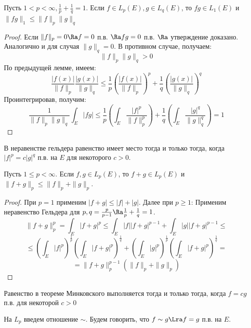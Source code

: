 \begin{theorem}[Гельдер]
    Пусть \(1 < p < \infty, \frac{1}{p} + \frac{1}{q} = 1\). Если \(f \in L_p(E), g \in L_q(E)\), то \(fg \in L_1(E)\) и \(\|fg\|_1 \le \|f\|_p\|g\|_q\)
\end{theorem}
\begin{proof}
    Если \(\|f\|_p = 0 \Ra f = 0\) п.в. \(\Ra fg = 0\) п.в. \(\Ra \) утверждение доказано. Аналогично и для случая \(\|g\|_q = 0\). В противном случае, получаем:
    \[\|f\|_p\|g\|_q > 0\]
    По предыдущей лемме, имеем:
    \[\frac{|f(x)|}{\|f\|_p}\frac{|g(x)|}{\|g\|_q} \le \frac{1}{p}\left( \frac{|f(x)|}{\|f\|_p} \right)^p + \frac{1}{q}\left( \frac{|g(x)|}{\|g\|_q} \right)^q\]
    Проинтегрировав, получим:
    \[\frac{1}{\|f\|_p\|g\|_q}\int_E |fg| \le \frac{1}{p}\left( \int_E \frac{|f|^p}{\|f\|_p^p} \right) + \frac{1}{q}\left( \int_E \frac{|g|^q}{\|g\|_q^q} \right) = 1\]
\end{proof}

\begin{note}
    В неравенстве гельдера равенство имеет место тогда и только тогда, когда \(|f|^p = c|g|^q\) п.в. на \(E\) для некоторого \(c > 0\).
\end{note}

\begin{theorem}[Минковский]
    Пусть \(1 \le p < \infty\). Если \(f, g \in L_p(E)\), то \(f + g \in L_p(E)\) и \(\|f + g\|_p \le \|f\|_p + \|g\|_p\).
\end{theorem}
\begin{proof}
    При \(p = 1\) применим \(|f + g| \le |f| + |g|\). Далее при \(p \ge 1\): Применим неравенство Гельдера для \(p, q = \frac{p}{p - 1} \Ra \frac{1}{p} + \frac{1}{q} = 1\). 
    \[\|f + g\|_p^p = \int_E |f + g|^p \le \int_E |f||f + g|^{p - 1} + \int_E |g||f + g|^{p - 1} \le\]
    \[\le \left( \int_E |f|^p \right)^{\frac{1}{p}}\left( \int_E |f + g|^p \right)^{\frac{1}{q}} + \left( \int_E |g|^p \right)^{\frac{1}{p}}\left( \int_E |f + g|^p \right)^{\frac{1}{q}} = \]
    \[ = \|f + g\|_p^{p - 1}(\|f\|_p + \|g\|_p)\]
\end{proof}

\begin{note}
    Равенство в теореме Минковского выполняется тогда и только тогда, когда \(f = cg\) п.в. для некоторой \(c > 0\)
\end{note}

\begin{definition}
    На \(L_p\) введем отношение \(\sim\). Будем говорить, что \(f \sim g \Lra f = g\) п.в. на \(E\).
\end{definition}

